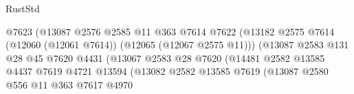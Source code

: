 \begin{lexlean}{RustStd}
\begin{coremodule}
                                                  @7623
                                                  (@13087
                                                    @2576
                                                    @2585
                                                    @11
                                                    @363
                                                    @7614
                                                    @7622
                                                    (@13182
                                                      @2575
                                                      @7614
                                                      (@12060 (@12061 @7614))
                                                      (@12065 (@12067 @2575 @11)))
                                                    (@13087
                                                      @2583
                                                      @131
                                                      @28
                                                      @45
                                                      @7620
                                                      @4431
                                                      (@13067
                                                        @2583
                                                        @28
                                                        @7620
                                                        (@14481
                                                          @2582
                                                          @13585
                                                          @4437
                                                          @7619
                                                          @4721
                                                          @13594
                                                          (@13082
                                                            @2582
                                                            @13585
                                                            @7619
                                                            (@13087
                                                              @2580
                                                              @556
                                                              @11
                                                              @363
                                                              @7617
                                                              @4970

\end{coremodule}
\end{lexlean}
